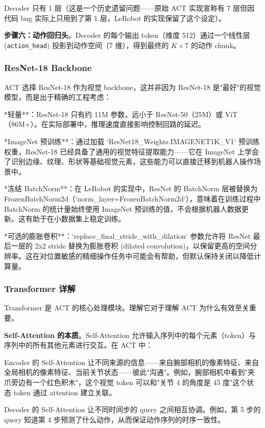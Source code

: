 \documentclass[UTF8,a4paper,11pt]{ctexart}
\begin{document}
{Decoder 只有 1 层（这是一个历史遗留问题——原始 ACT 实现宣称有 7 层但因代码 bug 实际上只用到了第 1 层，LeRobot 的实现保留了这个设定）。

\textbf{步骤六：动作回归头}。Decoder 的每个输出 token（维度 512）通过一个线性层 (\texttt{action_head}) 投影到动作空间（7 维），得到最终的 $K \times 7$ 的动作 chunk。

\subsubsection{ResNet-18 Backbone}

ACT 选择 ResNet-18 作为视觉 backbone，这并非因为 ResNet-18 是"最好"的视觉模型，而是出于精确的工程考虑：

\item **轻量**：ResNet-18 只有约 11M 参数，远小于 ResNet-50（25M）或 ViT（86M+）。在实际部署中，推理速度直接影响控制回路的延迟。
\item **ImageNet 预训练**：通过加载 `ResNet18_Weights.IMAGENET1K_V1` 预训练权重，ResNet-18 已经具备了通用的视觉特征提取能力——它在 ImageNet 上学会了识别边缘、纹理、形状等基础视觉元素，这些能力可以直接迁移到机器人操作场景中。
\item **冻结 BatchNorm**：在 LeRobot 的实现中，ResNet 的 BatchNorm 层被替换为 FrozenBatchNorm2d（`norm_layer=FrozenBatchNorm2d`），意味着在训练过程中 BatchNorm 的统计量始终使用 ImageNet 预训练的值，不会根据机器人数据更新。这有助于在小数据集上稳定训练。
\item **可选的膨胀卷积**：`replace_final_stride_with_dilation` 参数允许将 ResNet 最后一层的 2x2 stride 替换为膨胀卷积 (dilated convolution)，以保留更高的空间分辨率。这在对位置敏感的精细操作任务中可能会有帮助，但默认保持关闭以降低计算量。

\subsubsection{Transformer 详解}

Transformer 是 ACT 的核心处理模块。理解它对于理解 ACT 为什么有效至关重要。

\textbf{Self-Attention 的本质}。Self-Attention 允许输入序列中的每个元素（token）与序列中的所有其他元素进行交互。在 ACT 中：

\item Encoder 的 Self-Attention 让不同来源的信息——来自腕部相机的像素特征、来自全局相机的像素特征、当前关节状态——彼此"沟通"。例如，腕部相机中看到"夹爪旁边有一个红色积木"，这个视觉 token 可以和"关节 4 的角度是 45 度"这个状态 token 通过 attention 建立关联。
\item Decoder 的 Self-Attention 让不同时间步的 query 之间相互协调。例如，第 5 步的 query 知道第 4 步预测了什么动作，从而保证动作序列的时序一致性。

}
\end{document}
